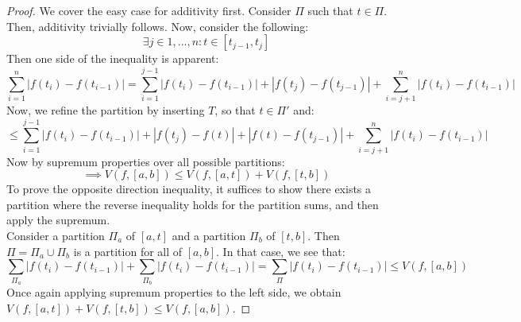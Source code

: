 \documentclass[10pt,letterpaper]{article} %
\begin{document}
\begin{proof}
We cover the easy case for additivity first. Consider $\Pi$ such that $t \in \Pi$. Then, additivity trivially follows. Now, consider the following:
\begin{equation*}
\exists j \in 1,...,n: t \in [t_{j-1}, t_j]
\end{equation*}
Then one side of the inequality is apparent:
\begin{equation*}
\sum_{i=1}^{n}|f(t_i) - f(t_{i-1})| = \sum_{i=1}^{j-1}|f(t_{i}) - f(t_{i-1})| + |f(t_j) - f(t_{j-1})| + \sum_{i=j+1}^{n}|f(t_{i}) - f(t_{i-1})|
\end{equation*}
Now, we refine the partition by inserting $T$, so that $t \in \Pi'$ and:
\begin{equation*}
  \leqslant \sum_{i=1}^{j-1}|f(t_{i}) - f(t_{i-1})| + |f(t_j) - f(t)| + |f(t) - f(t_{j-1})| + \sum_{i=j+1}^{n}|f(t_{i}) - f(t_{i-1})|
\end{equation*}
Now by supremum properties over all possible partitions:
\begin{equation*}
\implies V(f, [a, b]) \leqslant V(f, [a, t]) + V(f, [t, b])
\end{equation*}
To prove the opposite direction inequality, it suffices to show there exists a partition where the reverse inequality holds for the partition sums, and then apply the supremum.\\

Consider a partition $\Pi_a$ of $[a, t]$ and a partition $\Pi_b$ of $[t, b]$. Then $\Pi = \Pi_a \cup \Pi_b$ is a partition for all of $[a, b]$. In that case, we see that:
\begin{equation*}
\sum_{\Pi_a}|f(t_i) - f(t_{i-1})| + \sum_{\Pi_b}|f(t_i) - f(t_{i-1})| = \sum_{\Pi}|f(t_i) - f(t_{i-1})| \leqslant V(f, [a, b])
\end{equation*}
Once again applying supremum properties to the left side, we obtain $V(f, [a, t]) + V(f, [t, b]) \leqslant V(f, [a, b])$. 
\end{proof}
\end{document}
